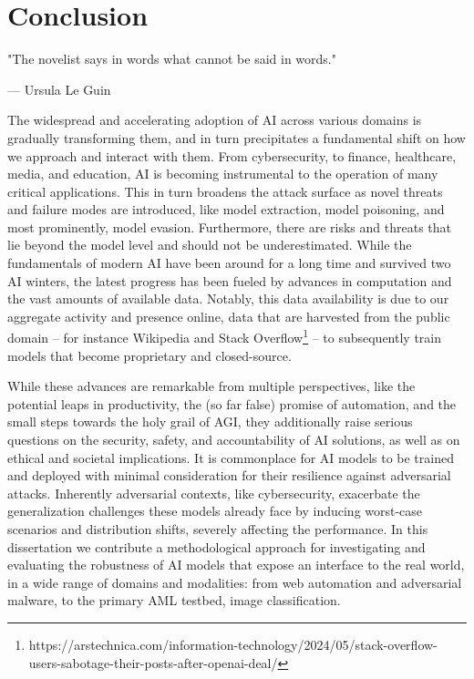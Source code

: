 \chapter{Conclusion}\label{ch:conclusion}

\epigraph{"The novelist says in words what cannot be said in words."}{--- Ursula Le Guin}

The widespread and accelerating adoption of \gls{AI} across various domains is gradually transforming them, and in turn precipitates a fundamental shift on how we approach and interact with them. 
From cybersecurity, to finance, healthcare, media, and education, AI is becoming instrumental to the operation of many critical applications.
This in turn broadens the attack surface as novel threats and failure modes are introduced, like model extraction, model poisoning, and most prominently, model evasion.
Furthermore, there are risks and threats that lie beyond the model level and should not be underestimated.
While the fundamentals of modern AI have been around for a long time and survived two \gls{AI} winters, the latest progress has been fueled by advances in computation and the vast amounts of available data.
Notably, this data availability is due to our aggregate activity and presence online, data that are harvested from the public domain -- for instance Wikipedia and Stack Overflow\footnote{https://arstechnica.com/information-technology/2024/05/stack-overflow-users-sabotage-their-posts-after-openai-deal/} -- to subsequently train models that become proprietary and closed-source.

While these advances are remarkable from multiple perspectives, like the potential leaps in productivity, the (so far false) promise of automation, and the small steps towards the holy grail of \gls{AGI}, they additionally raise serious questions on the security, safety, and accountability of \gls{AI} solutions, as well as on ethical and societal implications.
It is commonplace for \gls{AI} models to be trained and deployed with minimal consideration for their resilience against adversarial attacks.
Inherently adversarial contexts, like cybersecurity, exacerbate the generalization challenges these models already face by inducing worst-case scenarios and distribution shifts, severely affecting the performance.
In this dissertation we contribute a methodological approach for investigating and evaluating the robustness of AI models that expose an interface to the real world, in a wide range of domains and modalities: from web automation and adversarial malware, to the primary \gls{AML} testbed, image classification.

